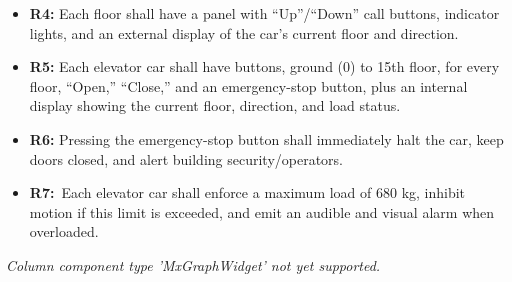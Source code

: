 \noindent
\begin{minipage}[t]{0.48\textwidth}\vspace{0pt}
\begin{itemize}
\item
\textbf{R4:} Each floor shall have a panel with ``Up''/``Down'' call buttons, indicator lights, and an external display of the car's current floor and direction.
\item
\textbf{R5:} Each elevator car shall have buttons, ground (0) to 15th floor, for every floor, ``Open,'' ``Close,'' and an emergency-stop button, plus an internal display showing the current floor, direction, and load status.
\item
\textbf{R6:} Pressing the emergency-stop button shall immediately halt the car, keep doors closed, and alert building security/operators.
\item
\textbf{R7:}~Each elevator car shall enforce a maximum load of 680 kg, inhibit motion if this limit is exceeded, and emit an audible and visual alarm when overloaded.
\end{itemize}
\end{minipage}
\hfill
\begin{minipage}[t]{0.48\textwidth}\vspace{0pt}
\textit{Column component type 'MxGraphWidget' not yet supported.}
\end{minipage}

